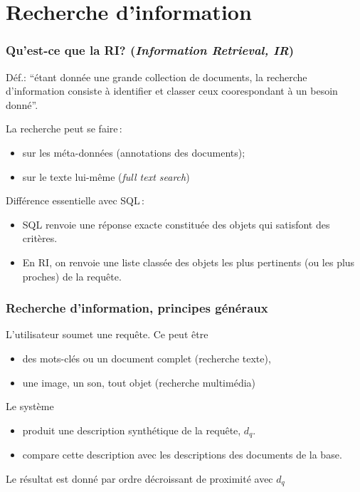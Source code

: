 \section{Recherche d'information}


\begin{frame}
\frametitle{Qu'est-ce que la RI? (\textit{Information Retrieval, IR})}

Déf.: ``étant donnée une grande collection de documents, la recherche d'information
consiste à identifier et classer ceux coorespondant à un besoin donné''.

\vfill
La recherche peut se faire\,:


\begin{itemize}
  \item sur les méta-données (annotations des documents);
  \item sur le texte lui-même (\textit{full text search})
\end{itemize}

\vfill

Différence essentielle avec SQL\,:

\begin{itemize}
  \item SQL renvoie une réponse \alert{exacte} constituée des objets qui satisfont des \alert{critères}.
  \item En RI, on renvoie une liste \alert{classée} des objets les plus pertinents (ou les plus proches) de la requête. 
\end{itemize}

\end{frame}


\begin{frame}
\frametitle{Recherche d'information, principes généraux}

L'utilisateur soumet une \alert{requête}. Ce peut être

\begin{itemize}
  \item des mots-clés ou un document complet (recherche texte),
  \item une image, un son, tout objet (recherche multimédia)
\end{itemize}

Le système 
\begin{itemize}
   \item produit une \alert{description} synthétique de la requête, $d_q$.
     \item \alert{compare} cette description avec les descriptions des documents de la base.
   \end{itemize}

 Le résultat est donné par ordre décroissant de proximité avec $d_q$   
\end{frame}



